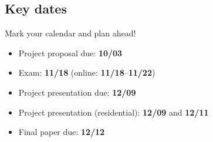 \documentclass[11pt,article,oneside]{memoir} %
\begin{document}
\subsection{Key dates}\label{sub:key_dates} %

Mark your calendar and plan ahead! 

\begin{itemize}
\item Project proposal due: \textbf{10/03}
\item Exam: \textbf{11/18} (online: \textbf{11/18}--\textbf{11/22})
\item Project presentation due: \textbf{12/09}
\item Project presentation (residential): \textbf{12/09} and \textbf{12/11}
\item Final paper due: \textbf{12/12}
\end{itemize} 



%
\end{document}
